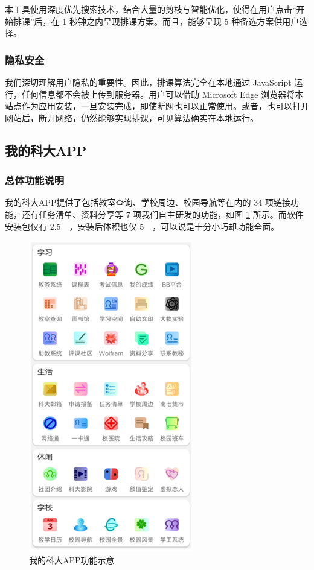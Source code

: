 本工具使用深度优先搜索技术，结合大量的剪枝与智能优化，使得在用户点击“开始排课”后，在 1 秒钟之内呈现排课方案。而且，能够呈现 5 种备选方案供用户选择。

\subsubsection{隐私安全}

我们深切理解用户隐私的重要性。因此，排课算法完全在本地通过 JavaScript 运行，任何信息都不会被上传到服务器。用户可以借助 Microsoft Edge 浏览器将本站点作为应用安装，一旦安装完成，即使断网也可以正常使用。或者，也可以打开网站后，断开网络，仍然能够实现排课，可见算法确实在本地运行。

\subsection{我的科大APP}

\subsubsection{总体功能说明}

我的科大APP提供了包括教室查询、学校周边、校园导航等在内的 34 项链接功能，还有任务清单、资料分享等 7 项我们自主研发的功能，如图 \ref{fig:m1} 所示。而软件安装包仅有 \qty{2.5}{\mega\byte}，安装后体积也仅 \qty{5}{\mega\byte}，可以说是十分小巧却功能全面。

\begin{figure}[htb]
  \centering
  \includegraphics[width=0.6\columnwidth]{figure/m1.png}
  \caption{我的科大APP功能示意}
  \label{fig:m1}
\end{figure}

